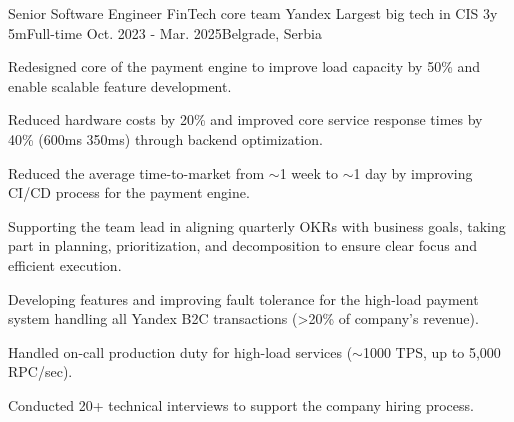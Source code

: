 \begin{cventries}
  \cventry
    {Senior Software Engineer} %
    {FinTech core team} %
    {Yandex} %
    {Largest big tech in CIS} %
    {3y 5m{\enskip\cdotp\enskip}Full-time} %
    {Oct. 2023 - Mar. 2025{\enskip\cdotp\enskip}Belgrade, Serbia} %
    {
      \begin{cvitemstitled} %
        \item {Redesigned core of the payment engine to improve load capacity by 50\% and enable scalable feature development.}
        \item {Reduced hardware costs by 20\% and improved core service response times by 40\% (600ms \rightarrow 350ms) through backend optimization.}
        \item {Reduced the average time-to-market from $\sim$1 week to $\sim$1 day by improving CI/CD process for the payment engine.}
      \end{cvitemstitled}
      \begin{cvitemstitledended}
        \item {Supporting the team lead in aligning quarterly OKRs with business goals, taking part in planning, prioritization, and decomposition to ensure clear focus and efficient execution.}
        \item {Developing features and improving fault tolerance for the high-load payment system handling all Yandex B2C transactions (>20\% of company's revenue).}
        \item {Handled on-call production duty for high-load services ($\sim$1000 TPS, up to 5,000 RPC/sec).}
        \item {Conducted 20+ technical interviews to support the company hiring process.}
      \end{cvitemstitledended}
    }


\end{cventries}
